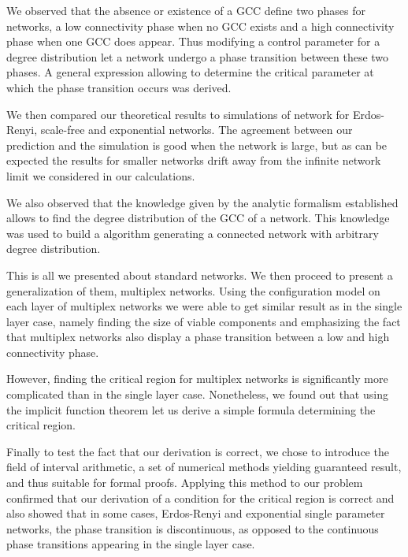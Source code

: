 \documentclass[
11pt, %
american, %
singlespacing, %
final, %
nolistspacing, %
liststotoc, %
headsepline, %
]{MastersDoctoralThesis} %
\begin{document}
We observed that the absence or existence of a GCC define two phases for networks, a low connectivity phase when no GCC exists and a high connectivity phase when one GCC does appear. Thus modifying a control parameter for a degree distribution let a network undergo a phase transition between these two phases. A general expression allowing to determine the critical parameter at which the phase transition occurs was derived.

We then compared our theoretical results to simulations of network for Erdos-Renyi, scale-free and exponential networks. The agreement between our prediction and the simulation is good when the network is large, but as can be expected the results for smaller networks drift away from the infinite network limit we considered in our calculations.

We also observed that the knowledge given by the analytic formalism established allows to find the degree distribution of the GCC of a network. This knowledge was used to build a algorithm generating a connected network with arbitrary degree distribution.

This is all we presented about standard networks. We then proceed to present a generalization of them, multiplex networks. Using the configuration model on each layer of multiplex networks we were able to get similar result as in the single layer case, namely finding the size of viable components and emphasizing the fact that multiplex networks also display a phase transition between a low and high connectivity phase.

However, finding the critical region for multiplex networks is significantly more complicated than in the single layer case. Nonetheless, we found out that using the implicit function theorem let us derive a simple formula determining the critical region.

Finally to test the fact that our derivation is correct, we chose to introduce the field of interval arithmetic, a set of numerical methods yielding guaranteed result, and thus suitable for formal proofs. Applying this method to our problem confirmed that our derivation of a condition for the critical region is correct and also showed that in some cases, Erdos-Renyi and exponential single parameter networks, the phase transition is discontinuous, as opposed to the continuous phase transitions appearing in the single layer case.
\end{document}
